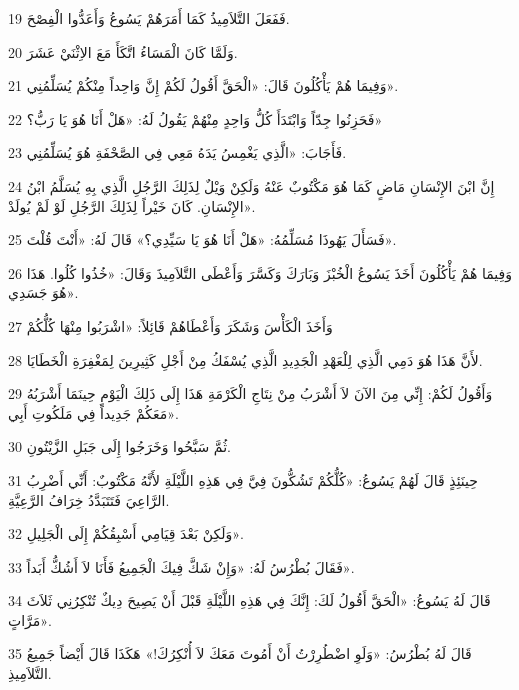 \par 19 فَفَعَلَ التَّلاَمِيذُ كَمَا أَمَرَهُمْ يَسُوعُ وَأَعَدُّوا الْفِصْحَ.
\par 20 وَلَمَّا كَانَ الْمَسَاءُ اتَّكَأَ مَعَ الاِثْنَيْ عَشَرَ.
\par 21 وَفِيمَا هُمْ يَأْكُلُونَ قَالَ: «الْحَقَّ أَقُولُ لَكُمْ إِنَّ وَاحِداً مِنْكُمْ يُسَلِّمُنِي».
\par 22 فَحَزِنُوا جِدّاً وَابْتَدَأَ كُلُّ وَاحِدٍ مِنْهُمْ يَقُولُ لَهُ: «هَلْ أَنَا هُوَ يَا رَبُّ؟»
\par 23 فَأَجَابَ: «الَّذِي يَغْمِسُ يَدَهُ مَعِي فِي الصَّحْفَةِ هُوَ يُسَلِّمُنِي.
\par 24 إِنَّ ابْنَ الإِنْسَانِ مَاضٍ كَمَا هُوَ مَكْتُوبٌ عَنْهُ وَلَكِنْ وَيْلٌ لِذَلِكَ الرَّجُلِ الَّذِي بِهِ يُسَلَّمُ ابْنُ الإِنْسَانِ. كَانَ خَيْراً لِذَلِكَ الرَّجُلِ لَوْ لَمْ يُولَدْ».
\par 25 فَسَأَلَ يَهُوذَا مُسَلِّمُهُ: «هَلْ أَنَا هُوَ يَا سَيِّدِي؟» قَالَ لَهُ: «أَنْتَ قُلْتَ».
\par 26 وَفِيمَا هُمْ يَأْكُلُونَ أَخَذَ يَسُوعُ الْخُبْزَ وَبَارَكَ وَكَسَّرَ وَأَعْطَى التَّلاَمِيذَ وَقَالَ: «خُذُوا كُلُوا. هَذَا هُوَ جَسَدِي».
\par 27 وَأَخَذَ الْكَأْسَ وَشَكَرَ وَأَعْطَاهُمْ قَائِلاً: «اشْرَبُوا مِنْهَا كُلُّكُمْ
\par 28 لأَنَّ هَذَا هُوَ دَمِي الَّذِي لِلْعَهْدِ الْجَدِيدِ الَّذِي يُسْفَكُ مِنْ أَجْلِ كَثِيرِينَ لِمَغْفِرَةِ الْخَطَايَا.
\par 29 وَأَقُولُ لَكُمْ: إِنِّي مِنَ الآنَ لاَ أَشْرَبُ مِنْ نِتَاجِ الْكَرْمَةِ هَذَا إِلَى ذَلِكَ الْيَوْمِ حِينَمَا أَشْرَبُهُ مَعَكُمْ جَدِيداً فِي مَلَكُوتِ أَبِي».
\par 30 ثُمَّ سَبَّحُوا وَخَرَجُوا إِلَى جَبَلِ الزَّيْتُونِ.
\par 31 حِينَئِذٍ قَالَ لَهُمْ يَسُوعُ: «كُلُّكُمْ تَشُكُّونَ فِيَّ فِي هَذِهِ اللَّيْلَةِ لأَنَّهُ مَكْتُوبٌ: أَنِّي أَضْرِبُ الرَّاعِيَ فَتَتَبَدَّدُ خِرَافُ الرَّعِيَّةِ.
\par 32 وَلَكِنْ بَعْدَ قِيَامِي أَسْبِقُكُمْ إِلَى الْجَلِيلِ».
\par 33 فَقَالَ بُطْرُسُ لَهُ: «وَإِنْ شَكَّ فِيكَ الْجَمِيعُ فَأَنَا لاَ أَشُكُّ أَبَداً».
\par 34 قَالَ لَهُ يَسُوعُ: «الْحَقَّ أَقُولُ لَكَ: إِنَّكَ فِي هَذِهِ اللَّيْلَةِ قَبْلَ أَنْ يَصِيحَ دِيكٌ تُنْكِرُنِي ثَلاَثَ مَرَّاتٍ».
\par 35 قَالَ لَهُ بُطْرُسُ: «وَلَوِ اضْطُرِرْتُ أَنْ أَمُوتَ مَعَكَ لاَ أُنْكِرُكَ!» هَكَذَا قَالَ أَيْضاً جَمِيعُ التَّلاَمِيذِ.
